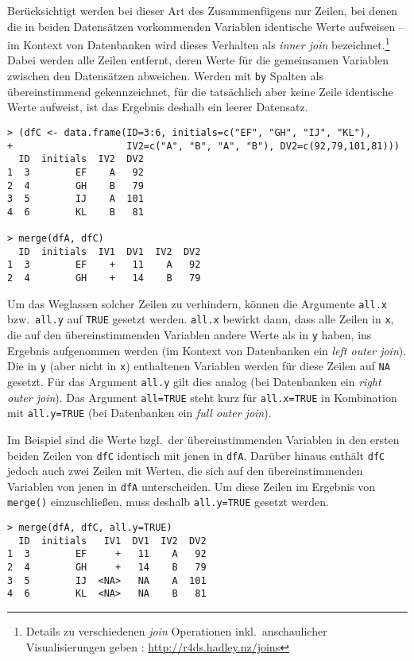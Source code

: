 Berücksichtigt werden bei dieser Art des Zusammenfügens nur Zeilen, bei denen die in beiden Datensätzen vorkommenden Variablen identische Werte aufweisen -- im Kontext von Datenbanken wird dieses Verhalten als \emph{inner join} bezeichnet.\footnote{\label{ftn:join}Details zu verschiedenen \emph{join} Operationen inkl.\ anschaulicher Visualisierungen geben : \url{http://r4ds.hadley.nz/joins}} Dabei werden alle Zeilen entfernt, deren Werte für die gemeinsamen Variablen zwischen den Datensätzen abweichen. Werden mit \lstinline!by! Spalten als übereinstimmend gekennzeichnet, für die tatsächlich aber keine Zeile identische Werte aufweist, ist das Ergebnis deshalb ein leerer Datensatz.
\begin{lstlisting}
> (dfC <- data.frame(ID=3:6, initials=c("EF", "GH", "IJ", "KL"),
+                    IV2=c("A", "B", "A", "B"), DV2=c(92,79,101,81)))
  ID  initials  IV2  DV2
1  3        EF    A   92
2  4        GH    B   79
3  5        IJ    A  101
4  6        KL    B   81

> merge(dfA, dfC)
  ID  initials  IV1  DV1  IV2  DV2
1  3        EF    +   11    A   92
2  4        GH    +   14    B   79
\end{lstlisting}

Um das Weglassen solcher Zeilen zu verhindern, können die Argumente \lstinline!all.x! bzw.\ \lstinline!all.y! auf \lstinline!TRUE! gesetzt werden. \lstinline!all.x! bewirkt dann, dass alle Zeilen in \lstinline!x!, die auf den übereinstimmenden Variablen andere Werte als in \lstinline!y! haben, ins Ergebnis aufgenommen werden (im Kontext von Datenbanken ein \emph{left outer join}). Die in \lstinline!y! (aber nicht in \lstinline!x!) enthaltenen Variablen werden für diese Zeilen auf \lstinline!NA! gesetzt. Für das Argument \lstinline!all.y! gilt dies analog (bei Datenbanken ein \emph{right outer join}). Das Argument \lstinline!all=TRUE! steht kurz für \lstinline!all.x=TRUE! in Kombination mit \lstinline!all.y=TRUE! (bei Datenbanken ein \emph{full outer join}).

Im Beispiel sind die Werte bzgl.\ der übereinstimmenden Variablen in den ersten beiden Zeilen von \lstinline!dfC! identisch mit jenen in \lstinline!dfA!\@. Darüber hinaus enthält \lstinline!dfC! jedoch auch zwei Zeilen mit Werten, die sich auf den übereinstimmenden Variablen von jenen in \lstinline!dfA! unterscheiden. Um diese Zeilen im Ergebnis von \lstinline!merge()! einzuschließen, muss deshalb \lstinline!all.y=TRUE! gesetzt werden.
\begin{lstlisting}
> merge(dfA, dfC, all.y=TRUE)
  ID  initials   IV1  DV1  IV2  DV2
1  3        EF     +   11    A   92
2  4        GH     +   14    B   79
3  5        IJ  <NA>   NA    A  101
4  6        KL  <NA>   NA    B   81
\end{lstlisting}

